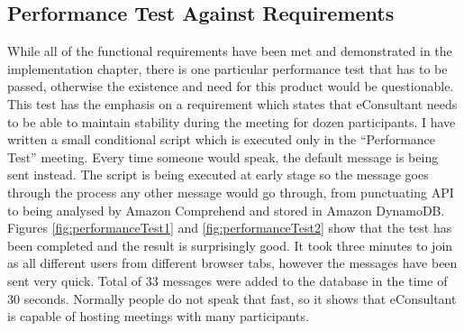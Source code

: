 \documentclass{article}
\begin{document}
\subsection{Performance Test Against Requirements}
{\large 
While all of the functional requirements have been met and demonstrated in the implementation chapter, there is one particular performance test that has to be passed, otherwise the existence and need for this product would be questionable. This test has the emphasis on a requirement which states that eConsultant needs to be able to maintain stability during the meeting for dozen participants. I have written a small conditional script which is executed only in the ``Performance Test'' meeting. Every time someone would speak, the default message is being sent instead. The script is being executed at early stage so the message goes through the process any other message would go through, from punctuating API to being analysed by Amazon Comprehend and stored in Amazon DynamoDB. Figures \ref{fig:performanceTest1} and \ref{fig:performanceTest2} show that the test has been completed and the result is surprisingly good. It took three minutes to join as all different users from different browser tabs, however the messages have been sent very quick. Total of 33 messages were added to the database in the time of 30 seconds. Normally people do not speak that fast, so it shows that eConsultant is capable of hosting meetings with many participants.\par
}
\end{document}
